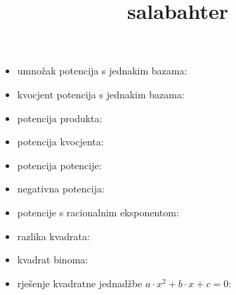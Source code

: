 \documentclass[10pt,oneside,a4paper]{report}
\title{salabahter}
\begin{document}
\noindent
{}
\begin{itemize}
\item umno\v{z}ak potencija s jednakim bazama: \hspace{1cm}
\item kvocjent potencija s jednakim bazama: \hspace{1cm}
\item potencija produkta: \hspace{1cm} 
\item potencija kvocjenta: \hspace{1cm} 
\item potencija potencije: \hspace{1cm} 
\item negativna potencija: \hspace{1cm} 
\item potencije s racionalnim eksponentom: \hspace{0.5cm}
 \hspace{1cm}
 \hspace{1cm}
\item razlika kvadrata: \hspace{1cm} 
\item kvadrat binoma: \hspace{1cm} 
\item rje\v{s}enje kvadratne jednad\v{z}be $a\cdot x^2+b\cdot x+c=0$: 
\hspace{1cm}
\end{itemize}
\end{document}

